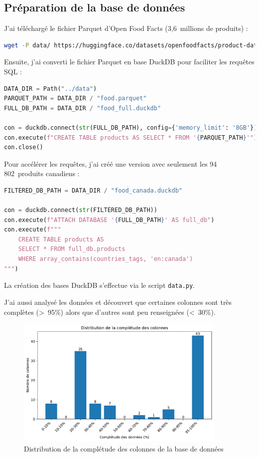 \documentclass[a4paper,11pt]{article}
\begin{document}
\subsection{Préparation de la base de données}

J'ai téléchargé le fichier Parquet d'Open Food Facts (3,6~millions de produits) :

\begin{lstlisting}[language=bash, caption=Téléchargement du fichier Parquet]
wget -P data/ https://huggingface.co/datasets/openfoodfacts/product-database/resolve/main/food.parquet
\end{lstlisting}

Ensuite, j'ai converti le fichier Parquet en base DuckDB pour faciliter les requêtes SQL :

\begin{lstlisting}[language=Python, caption=Conversion en base DuckDB]
DATA_DIR = Path("../data")
PARQUET_PATH = DATA_DIR / "food.parquet"
FULL_DB_PATH = DATA_DIR / "food_full.duckdb"

con = duckdb.connect(str(FULL_DB_PATH), config={'memory_limit': '8GB'})
con.execute(f"CREATE TABLE products AS SELECT * FROM '{PARQUET_PATH}'")
con.close()
\end{lstlisting}

\newpage
Pour accélérer les requêtes, j'ai créé une version avec seulement les 94\,802~produits canadiens :

\begin{lstlisting}[language=Python]
FILTERED_DB_PATH = DATA_DIR / "food_canada.duckdb"

con = duckdb.connect(str(FILTERED_DB_PATH))
con.execute(f"ATTACH DATABASE '{FULL_DB_PATH}' AS full_db")
con.execute(f"""
    CREATE TABLE products AS 
    SELECT * FROM full_db.products
    WHERE array_contains(countries_tags, 'en:canada')
""")
\end{lstlisting}

La création des bases DuckDB s'effectue via le script \texttt{data.py}.

J'ai aussi analysé les données et découvert que certaines colonnes sont très complètes (>~95\%) alors que d'autres sont peu renseignées (<~30\%).

\begin{figure}[htbp]
    \centering
    \includegraphics[width=0.9\textwidth]{figures/missing_values.pdf}
    \caption{Distribution de la complétude des colonnes de la base de données}
    \label{fig:missing-values}
\end{figure}
\end{document}
